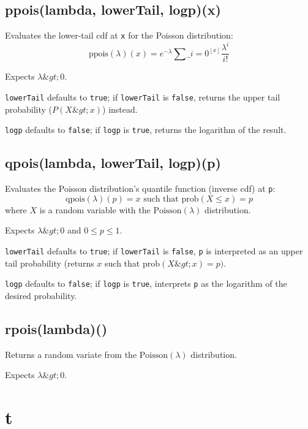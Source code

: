 \documentclass{article}
\begin{document}
    \subsection*{ppois(lambda, lowerTail, logp)(x)}
    Evaluates the lower-tail cdf at \texttt{x} for the Poisson distribution:
$$\textrm{ppois}(\lambda)(x) = e^{-\lambda} \sum\_{i=0}^{\left \lfloor{x}\right \rfloor}\frac{\lambda^i}{i!}$$


Expects $\lambda \&gt; 0$.


\texttt{lowerTail} defaults to \texttt{true}; if \texttt{lowerTail} is \texttt{false}, returns
the upper tail probability ($P(X \&gt; x)$) instead.


\texttt{logp} defaults to \texttt{false}; if \texttt{logp} is \texttt{true}, returns the logarithm
of the result.


    \subsection*{qpois(lambda, lowerTail, logp)(p)}
    Evaluates the Poisson distribution's quantile function
(inverse cdf) at \texttt{p}:
$$\textrm{qpois}(\lambda)(p) = x \textrm{ such that } \textrm{prob}(X \leq x) = p$$
where $X$ is a random variable with the $\textrm{Poisson}(\lambda)$ distribution.


Expects $\lambda \&gt; 0$ and $0 \leq p \leq 1$.


\texttt{lowerTail} defaults to \texttt{true}; if \texttt{lowerTail} is \texttt{false}, \texttt{p} is
interpreted as an upper tail probability (returns
$x$ such that $\textrm{prob}(X \&gt; x) = p)$.


\texttt{logp} defaults to \texttt{false}; if \texttt{logp} is \texttt{true}, interprets \texttt{p} as
the logarithm of the desired probability.


    \subsection*{rpois(lambda)()}
    Returns a random variate from the $\textrm{Poisson}(\lambda)$ distribution.


Expects $\lambda \&gt; 0$.


  \section{t}
\end{document}
